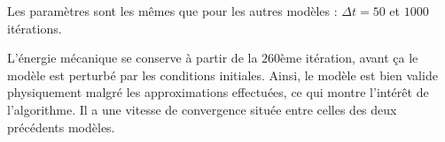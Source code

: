 Les paramètres sont les mêmes que pour les autres modèles : $\Delta t = 50$ et $1000$ itérations.

L'énergie mécanique se conserve à partir de la $260$ème itération, avant ça le modèle est perturbé par les conditions initiales. Ainsi, le modèle est bien valide physiquement malgré les approximations effectuées, ce qui montre l'intérêt de l'algorithme. Il a une vitesse de convergence située entre celles des deux précédents modèles.